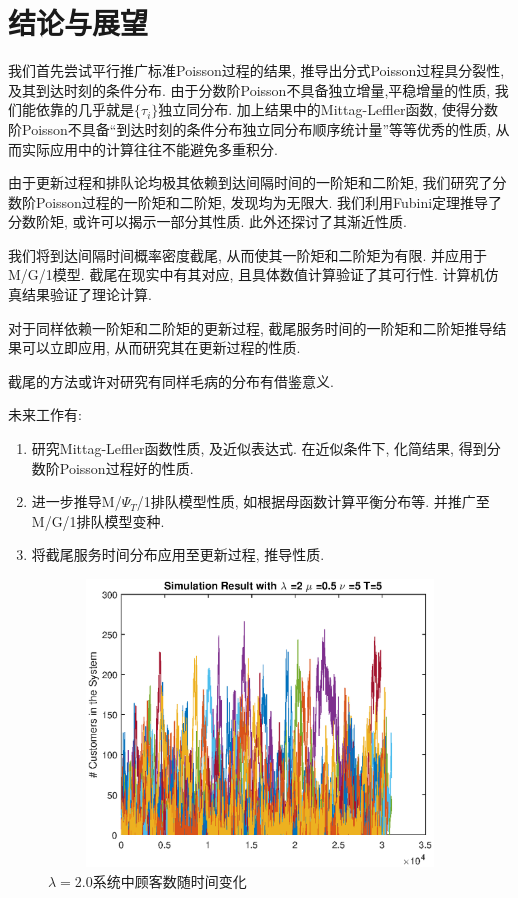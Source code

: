 \documentclass[a4paper, 12pt]{ctexart}
\begin{document}
\section{结论与展望}
我们首先尝试平行推广标准Poisson过程的结果, 推导出分式Poisson过程具分裂性, 及其到达时刻的条件分布. 由于分数阶Poisson不具备独立增量,平稳增量的性质, 我们能依靠的几乎就是$\{\tau_i\}$独立同分布. 加上结果中的Mittag-Leffler函数, 使得分数阶Poisson不具备``到达时刻的条件分布独立同分布顺序统计量''等等优秀的性质, 从而实际应用中的计算往往不能避免多重积分.

由于更新过程和排队论均极其依赖到达间隔时间的一阶矩和二阶矩, 我们研究了分数阶Poisson过程的一阶矩和二阶矩, 发现均为无限大. 我们利用Fubini定理推导了分数阶矩, 或许可以揭示一部分其性质. 此外还探讨了其渐近性质.

我们将到达间隔时间概率密度截尾, 从而使其一阶矩和二阶矩为有限. 并应用于M/G/1模型. 截尾在现实中有其对应, 且具体数值计算验证了其可行性. 计算机仿真结果验证了理论计算.

对于同样依赖一阶矩和二阶矩的更新过程, 截尾服务时间的一阶矩和二阶矩推导结果可以立即应用, 从而研究其在更新过程的性质. 

截尾的方法或许对研究有同样毛病的分布有借鉴意义.

未来工作有:
\begin{enumerate}
\item 研究Mittag-Leffler函数性质, 及近似表达式. 在近似条件下, 化简结果, 得到分数阶Poisson过程好的性质.

\item 进一步推导M/$\Psi_T$/1排队模型性质, 如根据母函数计算平衡分布等. 并推广至M/G/1排队模型变种.

\item 将截尾服务时间分布应用至更新过程, 推导性质.

\end{enumerate}

\begin{figure}[H]
\centering
\includegraphics[width=5in,height=3in]{sim.eps}
\caption{$\lambda=2.0$系统中顾客数随时间变化}
\label{fig:10}
\end{figure}
\bigskip
\end{document}
